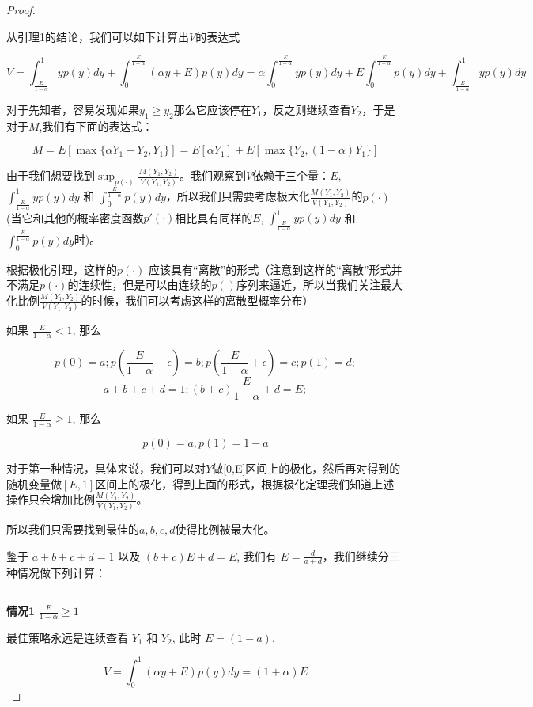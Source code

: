 \documentclass[bachelor]{thuthesis}
\begin{document}
\begin{proof}

$\ $

从引理1的结论，我们可以如下计算出$V$的表达式

\[V=\int_{\frac{E}{1-\alpha}}^{1} yp(y)dy+\int_{0}^{\frac{E}{1-\alpha}} (\alpha y+E)p(y)dy
=\alpha \int_{0}^{\frac{E}{1-\alpha}}yp(y)dy+E\int_{0}^{\frac{E}{1-\alpha}}p(y)dy+\int_{\frac{E}{1-\alpha}}^{1} yp(y)dy \]

对于先知者，容易发现如果$y_1\ge y_2$那么它应该停在$Y_1$，反之则继续查看$Y_2$，于是对于$M$,我们有下面的表达式：

\[M=E[\max\{\alpha Y_1+Y_2,Y_1\}]=E[\alpha Y_1]+E[\max\{Y_2,(1-\alpha)Y_1\}]\]


由于我们想要找到$\sup_{p(\cdot)}\frac{M(Y_1,Y_2)}{V(Y_1,Y_2)}$。我们观察到$V$依赖于三个量：$E$, $\int_{\frac{E}{1-\alpha}}^{1} yp(y)dy$ 和 $\int_{0}^{\frac{E}{1-\alpha}} p(y)dy$，所以我们只需要考虑极大化$\frac{M(Y_1,Y_2)}{V(Y_1,Y_2)}$的$p(\cdot)$(当它和其他的概率密度函数$p'(\cdot)$相比具有同样的$E$, $\int_{\frac{E}{1-\alpha}}^{1} yp(y)dy$ 和 $\int_{0}^{\frac{E}{1-\alpha}} p(y)dy$时)。

根据极化引理，这样的$p(\cdot)$ 应该具有“离散”的形式（注意到这样的“离散”形式并不满足$p(\cdot)$的连续性，但是可以由连续的$p()$序列来逼近，所以当我们关注最大化比例$\frac{M(Y_1,Y_2)}{V(Y_1,Y_2)}$的时候，我们可以考虑这样的离散型概率分布）

如果 $\frac{E}{1-\alpha}<1$, 那么

\[p(0)=a;p(\frac{E}{1-\alpha}-\epsilon)=b;p(\frac{E}{1-\alpha}+\epsilon)=c;p(1)=d; \]
\[a+b+c+d=1; (b+c)\frac{E}{1-\alpha}+d=E;\]

如果 $\frac{E}{1-\alpha}\ge 1$, 那么

\[p(0)=a,p(1)=1-a\]

对于第一种情况，具体来说，我们可以对$Y$做[0,E]区间上的极化，然后再对得到的随机变量做$[E,1]$区间上的极化，得到上面的形式，根据极化定理我们知道上述操作只会增加比例$\frac{M(Y_1,Y_2)}{V(Y_1,Y_2)}$。

所以我们只需要找到最佳的$a,b,c,d$使得比例被最大化。

鉴于 $a+b+c+d=1$ 以及 $(b+c)E+d=E$, 我们有 $E=\frac{d}{a+d}$，我们继续分三种情况做下列计算：

$\ $

\textbf{情况1} $\frac{E}{1-\alpha}\ge 1$

最佳策略永远是连续查看 $Y_1$ 和 $Y_2$, 此时 $E=(1-a)$.

\[V=\int_{0}^{1}(\alpha y+E)p(y)dy=(1+\alpha)E\]


\end{proof}
\end{document}
